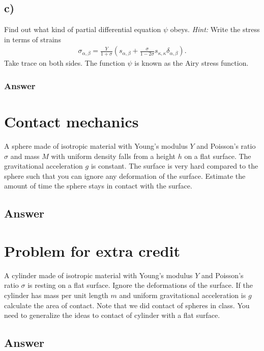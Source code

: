 \documentclass{article}
\begin{document}
\subsection*{c)}
Find out what kind of partial differential equation $\psi$ obeys. \textit{Hint:} Write the stress in terms of strains
\begin{align*}
    \sigma_{\alpha, \beta} = \frac{Y}{1+\sigma}\left(s_{\alpha,\beta} + \frac{\sigma}{1-2\sigma}s_{\kappa, \kappa}\delta_{\alpha,\beta}\right).
\end{align*}Take trace on both sides. The function $\psi$ is known as the Airy stress function.

\subsubsection*{Answer}




\section*{Contact mechanics}
A sphere made of isotropic material with Young's modulus $Y$ and Poisson's ratio $\sigma$ and mass $M$ with uniform density falls from a height $h$ on a flat surface.
The gravitational acceleration $g$ is constant. The surface is very hard compared to the sphere such that you can ignore any deformation of the surface. Estimate the amount of time the sphere stays in contact with the surface.

\subsection*{Answer}

\section*{Problem for extra credit}
A cylinder made of isotropic material with Young's modulus $Y$ and Poisson's ratio $\sigma$ is resting on a flat surface. Ignore the deformations of the surface.
If the cylinder has mass per unit length $m$ and uniform gravitational acceleration is $g$ calculate the area of contact. Note that we did contact of spheres in class. You need to generalize the ideas to contact of cylinder with a flat surface.

\subsection*{Answer}
\end{document}
